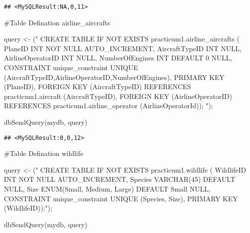 \documentclass[
]{article}
\newenvironment{Shaded}{\begin{snugshade}}{\end{snugshade}}
\newcommand{\FunctionTok}[1]{\textcolor[rgb]{0.00,0.00,0.00}{#1}}
\newcommand{\NormalTok}[1]{#1}
\newcommand{\OtherTok}[1]{\textcolor[rgb]{0.56,0.35,0.01}{#1}}
\newcommand{\StringTok}[1]{\textcolor[rgb]{0.31,0.60,0.02}{#1}}
\begin{document}
\begin{verbatim}
## <MySQLResult:NA,0,11>
\end{verbatim}

\#Table Defination airline\_aircrafts

\begin{Shaded}
\begin{Highlighting}[]
\NormalTok{query }\OtherTok{\textless{}{-}}\NormalTok{ (}\StringTok{"}
\StringTok{  CREATE TABLE IF NOT EXISTS practicum1.\textasciigrave{}airline\_aircrafts\textasciigrave{} (}
\StringTok{  \textasciigrave{}PlaneID\textasciigrave{} INT NOT NULL AUTO\_INCREMENT,}
\StringTok{  \textasciigrave{}AircraftTypeID\textasciigrave{} INT NULL,}
\StringTok{  \textasciigrave{}AirlineOperatorID\textasciigrave{} INT NULL,}
\StringTok{  \textasciigrave{}NumberOfEngines\textasciigrave{} INT  DEFAULT 0 NULL,}
\StringTok{  CONSTRAINT unique\_constraint UNIQUE (AircraftTypeID,AirlineOperatorID,NumberOfEngines),}
\StringTok{  PRIMARY KEY (\textasciigrave{}PlaneID\textasciigrave{}),}
\StringTok{  FOREIGN KEY (\textasciigrave{}AircraftTypeID\textasciigrave{}) REFERENCES practicum1.\textasciigrave{}aircraft\textasciigrave{} (\textasciigrave{}AircraftTypeID\textasciigrave{}),}
\StringTok{  FOREIGN KEY (\textasciigrave{}AirlineOperatorID\textasciigrave{}) REFERENCES practicum1.\textasciigrave{}airline\_operator\textasciigrave{} (\textasciigrave{}AirlineOperatorId\textasciigrave{}));}
\StringTok{  }
\StringTok{  "}\NormalTok{);}


\FunctionTok{dbSendQuery}\NormalTok{(mydb, query)}
\end{Highlighting}
\end{Shaded}

\begin{verbatim}
## <MySQLResult:0,0,12>
\end{verbatim}

\#Table Defination wildlife

\begin{Shaded}
\begin{Highlighting}[]
\NormalTok{query }\OtherTok{\textless{}{-}}\NormalTok{ (}\StringTok{"}
\StringTok{  CREATE TABLE IF NOT EXISTS practicum1.\textasciigrave{}wildlife\textasciigrave{} (}
\StringTok{  \textasciigrave{}WildlifeID\textasciigrave{} INT NOT NULL AUTO\_INCREMENT,}
\StringTok{  \textasciigrave{}Species\textasciigrave{} VARCHAR(45) DEFAULT \textquotesingle{} \textquotesingle{} NULL,}
\StringTok{  \textasciigrave{}Size\textasciigrave{} ENUM(\textquotesingle{}Small\textquotesingle{}, \textquotesingle{}Medium\textquotesingle{}, \textquotesingle{}Large\textquotesingle{}) DEFAULT \textquotesingle{}Small\textquotesingle{} NULL,}
\StringTok{  CONSTRAINT unique\_constraint UNIQUE (Species, Size),}
\StringTok{  PRIMARY KEY (\textasciigrave{}WildlifeID\textasciigrave{}));"}\NormalTok{);}

\FunctionTok{dbSendQuery}\NormalTok{(mydb, query)}
\end{Highlighting}
\end{Shaded}
\end{document}
